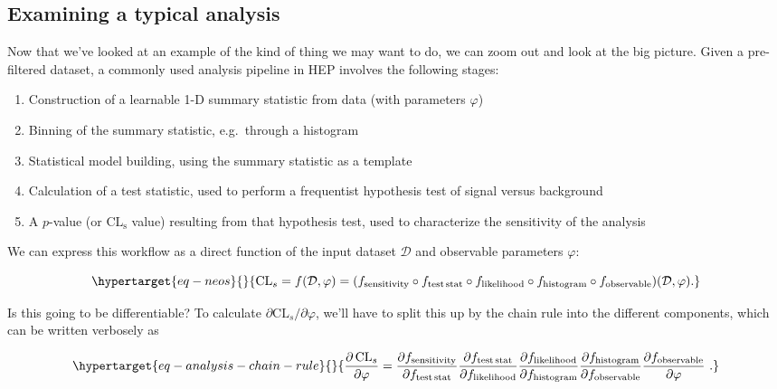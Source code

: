 \documentclass[
  11pt,
  numbers=noendperiod]{book}
\begin{document}
\hypertarget{examining-a-typical-analysis}{%
\subsection{Examining a typical
analysis}\label{examining-a-typical-analysis}}

Now that we've looked at an example of the kind of thing we may want to
do, we can zoom out and look at the big picture. Given a pre-filtered
dataset, a commonly used analysis pipeline in HEP involves the following
stages:

\begin{enumerate}
\def\labelenumi{\arabic{enumi}.}
\item
  Construction of a learnable 1-D summary statistic from data (with
  parameters \(\varphi\))
\item
  Binning of the summary statistic, e.g.~through a histogram
\item
  Statistical model building, using the summary statistic as a template
\item
  Calculation of a test statistic, used to perform a frequentist
  hypothesis test of signal versus background
\item
  A \(p\)-value (or \(\mathrm{CL_s}\) value) resulting from that
  hypothesis test, used to characterize the sensitivity of the analysis
\end{enumerate}

We can express this workflow as a direct function of the input dataset
\(\mathcal{D}\) and observable parameters \(\varphi\):

\begin{equation}\protect\hypertarget{eq-neos}{}{
    \mathrm{CL}_s = f(\mathcal{D},\varphi) = (f_{\mathrm{sensitivity}} \circ f_{\mathrm{test\,stat}} \circ f_{\mathrm{likelihood}}  \circ f_{\mathrm{histogram}}  \circ f_{\mathrm{observable}})(\mathcal{D},\varphi).
}\label{eq-neos}\end{equation}

Is this going to be differentiable? To calculate
\(\partial \text{CL}_s / \partial \varphi\), we'll have to split this up
by the chain rule into the different components, which can be written
verbosely as

\begin{equation}\protect\hypertarget{eq-analysis-chain-rule}{}{
\frac{\partial\,\mathrm{CL}_s}{\partial \varphi} = \frac{\partial f_{\mathrm{sensitivity}}}{\partial f_{\mathrm{test\,stat}}}\frac{\partial f_{\mathrm{test\,stat}}}{\partial f_{ \mathrm{likelihood}}} \frac{\partial f_{\mathrm{likelihood}}}{\partial f_{\mathrm{histogram}}}   \frac{\partial f_{\mathrm{histogram}}}{\partial f_{\mathrm{observable}}}  \frac{\partial f_{\mathrm{observable}}}{\partial \varphi}~.
}\label{eq-analysis-chain-rule}\end{equation}
\end{document}
